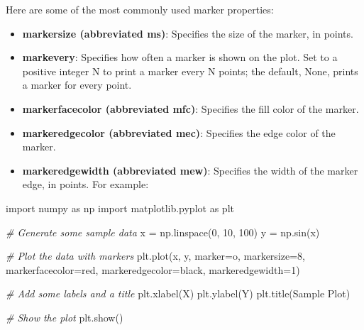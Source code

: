 \documentclass[11pt]{article}
\providecommand{\tightlist}{%
      \setlength{\itemsep}{0pt}\setlength{\parskip}{0pt}}
\newenvironment{Shaded}{}{}
\newcommand{\DecValTok}[1]{\textcolor[rgb]{0.25,0.63,0.44}{{#1}}}
\newcommand{\StringTok}[1]{\textcolor[rgb]{0.25,0.44,0.63}{{#1}}}
\newcommand{\CommentTok}[1]{\textcolor[rgb]{0.38,0.63,0.69}{\textit{{#1}}}}
\newcommand{\NormalTok}[1]{{#1}}
\newcommand{\ImportTok}[1]{{#1}}
\newcommand{\OperatorTok}[1]{\textcolor[rgb]{0.40,0.40,0.40}{{#1}}}
\begin{document}
Here are some of the most commonly used marker properties:

\begin{itemize}
\tightlist
\item
  \textbf{markersize (abbreviated ms)}: Specifies the size of the
  marker, in points.
\item
  \textbf{markevery}: Specifies how often a marker is shown on the plot.
  Set to a positive integer N to print a marker every N points; the
  default, None, prints a marker for every point.
\item
  \textbf{markerfacecolor (abbreviated mfc)}: Specifies the fill color
  of the marker.
\item
  \textbf{markeredgecolor (abbreviated mec)}: Specifies the edge color
  of the marker.
\item
  \textbf{markeredgewidth (abbreviated mew)}: Specifies the width of the
  marker edge, in points. For example:
\end{itemize}

\begin{Shaded}
\begin{Highlighting}[]
\ImportTok{import}\NormalTok{ numpy }\ImportTok{as}\NormalTok{ np}
\ImportTok{import}\NormalTok{ matplotlib.pyplot }\ImportTok{as}\NormalTok{ plt}

\CommentTok{\# Generate some sample data}
\NormalTok{x }\OperatorTok{=}\NormalTok{ np.linspace(}\DecValTok{0}\NormalTok{, }\DecValTok{10}\NormalTok{, }\DecValTok{100}\NormalTok{)}
\NormalTok{y }\OperatorTok{=}\NormalTok{ np.sin(x)}

\CommentTok{\# Plot the data with markers}
\NormalTok{plt.plot(x, y, marker}\OperatorTok{=}\StringTok{\textquotesingle{}o\textquotesingle{}}\NormalTok{, markersize}\OperatorTok{=}\DecValTok{8}\NormalTok{, markerfacecolor}\OperatorTok{=}\StringTok{\textquotesingle{}red\textquotesingle{}}\NormalTok{, markeredgecolor}\OperatorTok{=}\StringTok{\textquotesingle{}black\textquotesingle{}}\NormalTok{, markeredgewidth}\OperatorTok{=}\DecValTok{1}\NormalTok{)}

\CommentTok{\# Add some labels and a title}
\NormalTok{plt.xlabel(}\StringTok{\textquotesingle{}X\textquotesingle{}}\NormalTok{)}
\NormalTok{plt.ylabel(}\StringTok{\textquotesingle{}Y\textquotesingle{}}\NormalTok{)}
\NormalTok{plt.title(}\StringTok{\textquotesingle{}Sample Plot\textquotesingle{}}\NormalTok{)}

\CommentTok{\# Show the plot}
\NormalTok{plt.show()}
\end{Highlighting}
\end{Shaded}
\end{document}
